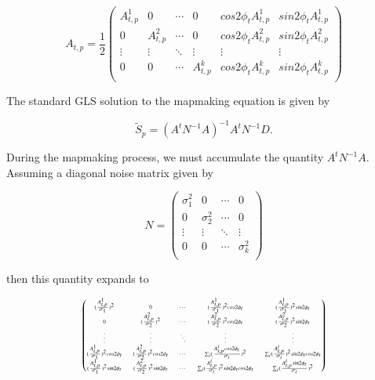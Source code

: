 \documentclass{aa}
\begin{document}
\begin{equation}
A_{t,p} = \frac{1}{2}\begin{pmatrix}
A^1_{t,p} & 0 & \cdots & 0 & cos2\phi_t A^1_{t,p} & sin2\phi_t A^1_{t,p} \\
0 & A^2_{t,p} & \cdots & 0 & cos2\phi_t A^2_{t,p} & sin2\phi_t A^2_{t,p} \\
\vdots & \vdots & \ddots & \vdots & \vdots & \vdots \\
0 & 0 & \cdots & A^k_{t,p} & cos2\phi_t A^k_{t,p} & sin2\phi_t A^k_{t,p} \\
\end{pmatrix}
\end{equation}

The standard GLS solution to the mapmaking equation is given by

\begin{equation}
\tilde{S}_p = (A^t N^{-1}A)^{-1} A^tN^{-1}D.
\end{equation}

During the mapmaking process, we must accumulate the quantity $A^tN^{-1}A$. Assuming a diagonal noise matrix given by

\begin{equation}
N = \begin{pmatrix}
\sigma^2_1 & 0 & \cdots & 0 \\
0 & \sigma^2_2 & \cdots & 0 \\
\vdots & \vdots & \ddots & \vdots \\
0 & 0 & \cdots & \sigma^2_k \\
\end{pmatrix}
\end{equation}

then this quantity expands to

\begin{equation*}
\begin{tiny}
\begin{pmatrix}
(\frac{A^1_{t,p}}{\sigma_1})^2 & 0 & \cdots &
(\frac{A^1_{t,p}}{\sigma_1})^2 cos2\phi_t & (\frac{A^1_{t,p}}{\sigma_1})^2 sin2\phi_t \\

0 & (\frac{A^2_{t,p}}{\sigma_2})^2 & \cdots &
(\frac{A^2_{t,p}}{\sigma_2})^2 cos2\phi_t & (\frac{A^2_{t,p}}{\sigma_2})^2 sin2\phi_t \\

\vdots & \vdots & \ddots & \vdots & \vdots \\

(\frac{A^1_{t,p}}{\sigma_1})^2 cos2\phi_t & (\frac{A^2_{t,p}}{\sigma_2})^2 cos2\phi_t & \cdots & 
\sum_{i} (\frac{A^i_{t,p} cos 2\phi_t}{\sigma_i})^2 & \sum_{i} (\frac{A^i_{t,p}}{\sigma_i})^2 sin2\phi_t cos2\phi_t \\

(\frac{A^1_{t,p}}{\sigma_1})^2 sin2\phi_t & (\frac{A^2_{t,p}}{\sigma_2})^2 sin2\phi_t & \cdots &
\sum_{i} (\frac{A^i_{t,p}}{\sigma_i})^2 sin2\phi_t cos2\phi_t & \sum_{i} (\frac{A^i_{t,p} sin 2\phi_t}{\sigma_i})^2
\\

\end{pmatrix}
\end{tiny}
\end{equation*}
\end{document}
